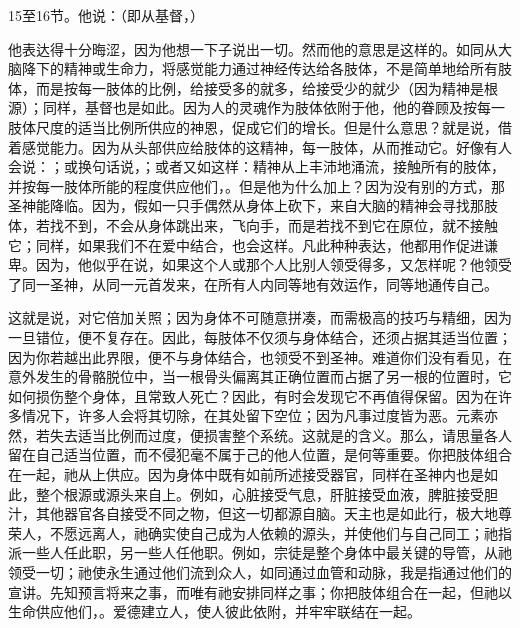 15至16节。他说：（即从基督，）\par

他表达得十分晦涩，因为他想一下子说出一切。然而他的意思是这样的。如同从大脑降下的精神或生命力，将感觉能力通过神经传达给各肢体，不是简单地给所有肢体，而是按每一肢体的比例，给接受多的就多，给接受少的就少（因为精神是根源）；同样，基督也是如此。因为人的灵魂作为肢体依附于他，他的眷顾及按每一肢体尺度的适当比例所供应的神恩，促成它们的增长。但是什么意思？就是说，借着感觉能力。因为从头部供应给肢体的这精神，每一肢体，从而推动它。好像有人会说：；或换句话说，；或者又如这样：精神从上丰沛地涌流，接触所有的肢体，并按每一肢体所能的程度供应他们，。但是他为什么加上？因为没有别的方式，那圣神能降临。因为，假如一只手偶然从身体上砍下，来自大脑的精神会寻找那肢体，若找不到，不会从身体跳出来，飞向手，而是若找不到它在原位，就不接触它；同样，如果我们不在爱中结合，也会这样。凡此种种表达，他都用作促进谦卑。因为，他似乎在说，如果这个人或那个人比别人领受得多，又怎样呢？他领受了同一圣神，从同一元首发来，在所有人内同等地有效运作，同等地通传自己。\par

\par

这就是说，对它倍加关照；因为身体不可随意拼凑，而需极高的技巧与精细，因为一旦错位，便不复存在。因此，每肢体不仅须与身体结合，还须占据其适当位置；因为你若越出此界限，便不与身体结合，也领受不到圣神。难道你们没有看见，在意外发生的骨骼脱位中，当一根骨头偏离其正确位置而占据了另一根的位置时，它如何损伤整个身体，且常致人死亡？因此，有时会发现它不再值得保留。因为在许多情况下，许多人会将其切除，在其处留下空位；因为凡事过度皆为恶。元素亦然，若失去适当比例而过度，便损害整个系统。这就是的含义。那么，请思量各人留在自己适当位置，而不侵犯毫不属于己的他人位置，是何等重要。你把肢体组合在一起，祂从上供应。因为身体中既有如前所述接受器官，同样在圣神内也是如此，整个根源或源头来自上。例如，心脏接受气息，肝脏接受血液，脾脏接受胆汁，其他器官各自接受不同之物，但这一切都源自脑。天主也是如此行，极大地尊荣人，不愿远离人，祂确实使自己成为人依赖的源头，并使他们与自己同工；祂指派一些人任此职，另一些人任他职。例如，宗徒是整个身体中最关键的导管，从祂领受一切；祂使永生通过他们流到众人，如同通过血管和动脉，我是指通过他们的宣讲。先知预言将来之事，而唯有祂安排同样之事；你把肢体组合在一起，但祂以生命供应他们，。爱德建立人，使人彼此依附，并牢牢联结在一起。\par

